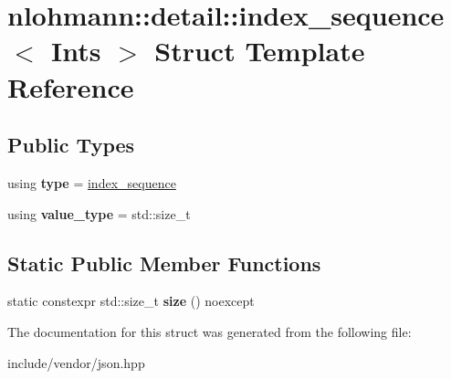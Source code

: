 \hypertarget{structnlohmann_1_1detail_1_1index__sequence}{}\section{nlohmann\+:\+:detail\+:\+:index\+\_\+sequence$<$ Ints $>$ Struct Template Reference}
\label{structnlohmann_1_1detail_1_1index__sequence}
\subsection*{Public Types}
\begin{DoxyCompactItemize}
\item 
\mbox{\label{structnlohmann_1_1detail_1_1index__sequence_a3c14c4ab277de72b166806193ff4fa10}} 
using {\bfseries type} = \mbox{\hyperlink{structnlohmann_1_1detail_1_1index__sequence}{index\+\_\+sequence}}
\item 
\mbox{\label{structnlohmann_1_1detail_1_1index__sequence_a2eca43d08fc1eb68bd5fa75b6714d21d}} 
using {\bfseries value\+\_\+type} = std\+::size\+\_\+t
\end{DoxyCompactItemize}
\subsection*{Static Public Member Functions}
\begin{DoxyCompactItemize}
\item 
\mbox{\label{structnlohmann_1_1detail_1_1index__sequence_a7ac529419787d775f52408135304b337}} 
static constexpr std\+::size\+\_\+t {\bfseries size} () noexcept
\end{DoxyCompactItemize}


The documentation for this struct was generated from the following file\+:\begin{DoxyCompactItemize}
\item 
include/vendor/json.\+hpp\end{DoxyCompactItemize}
